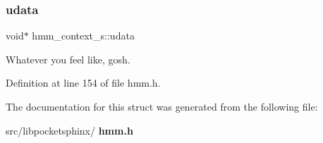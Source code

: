 \mbox{\label{structhmm__context__s_a1f80af93746230d41b4ee7e89786a4c7}} 
\subsubsection{udata}
{\footnotesize\ttfamily void$\ast$ hmm\+\_\+context\+\_\+s\+::udata}



Whatever you feel like, gosh. 



Definition at line 154 of file hmm.\+h.



The documentation for this struct was generated from the following file\+:\begin{DoxyCompactItemize}
\item 
src/libpocketsphinx/\textbf{ hmm.\+h}\end{DoxyCompactItemize}
